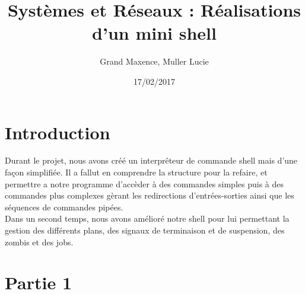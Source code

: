 \documentclass{report}
\author{Grand Maxence, Muller Lucie}
\title{Syst\`emes et R\'eseaux  : R\'ealisations d'un mini shell}
\date{17/02/2017}
\begin{document}
	
	\maketitle
	\tableofcontents

	\chapter*{Introduction}
	Durant le projet, nous avons cr\'e\'e un interpr\^eteur de commande shell mais d'une fa\c{c}on simplifi\'ee. Il a fallut en comprendre la structure pour la refaire, et permettre a notre programme d'acc\`eder \`a des commandes simples puis \`a des commandes plus complexes g\`erant les redirections d'entr\'ees-sorties ainsi que les s\'equences de commandes pip\'ees.\\
	Dans un second temps, nous avons am\'elior\'e notre shell pour lui permettant la gestion des diff\'erents plans, des signaux de terminaison et de suspension, des zombis et des jobs.
	\chapter{Partie 1}
\end{document}
